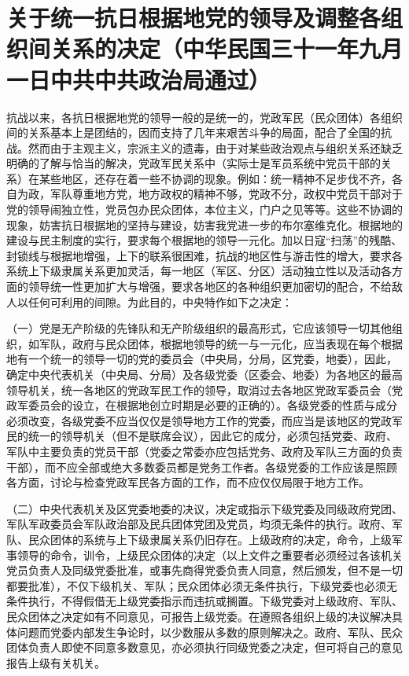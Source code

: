\section[关于统一抗日根据地党的领导及调整各组织间关系的决定（中华民国三十一年九月一日中共中共政治局通过）]{关于统一抗日根据地党的领导及调整各组织间关系的决定（中华民国三十一年九月一日中共中共政治局通过）}


抗战以来，各抗日根据地党的领导一般的是统一的，党政军民（民众团体）各组织间的关系基本上是团结的，因而支持了几年来艰苦斗争的局面，配合了全国的抗战。然而由于主观主义，宗派主义的遗毒，由于对某些政治观点与组织关系还缺乏明确的了解与恰当的解决，党政军民关系中（实际士是军员系统中党员干部的关系）在某些地区，还存在着一些不协调的现象。例如：统一精神不足步伐不齐，各自为政，军队尊重地方党，地方政权的精神不够，党政不分，政权中党员干部对于党的领导闹独立性，党员包办民众团体，本位主义，门户之见等等。这些不协调的现象，妨害抗日根据地的坚持与建设，妨害我党进一步的布尔塞维克化。根据地的建设与民主制度的实行，要求每个根据地的领导一元化。加以日寇“扫荡”的残酷、封锁线与根据地增强，上下的联系很困难，抗战的地区性与游击性的增大，要求各系统上下级隶属关系更加灵活，每一地区（军区、分区）活动独立性以及活动各方面的领导统一性更加扩大与增强，要求各地区的各种组织更加密切的配合，不给敌人以任何可利用的间隙。为此目的，中央特作如下之决定：

（一）党是无产阶级的先锋队和无产阶级组织的最高形式，它应该领导一切其他组织，如军队，政府与民众团体，根据地领导的统一与一元化，应当表现在每个根据地有一个统一的领导一切的党的委员会（中央局，分局，区党委，地委），因此，确定中央代表机关（中央局、分局）及各级党委（区委会、地委）为各地区的最高领导机关，统一各地区的党政军民工作的领导，取消过去各地区党政军委员会（党政军委员会的设立，在根据地创立时期是必要的正确的）。各级党委的性质与成分必须改变，各级党委不应当仅仅是领导地方工作的党委，而应当是该地区的党政军民的统一的领导机关（但不是联席会议），因此它的成分，必须包括党委、政府、军队中主要负责的党员干部（党委之常委亦应包括党务、政府及军队三方面的负责干部），而不应全部或绝大多数委员都是党务工作者。各级党委的工作应该是照顾各方面，讨论与检查党政军民各方面的工作，而不应仅仅局限于地方工作。

（二）中央代表机关及区党委地委的决议，决定或指示下级党委及同级政府党团、军队军政委员会军队政治部及民兵团体党团及党员，均须无条件的执行。政府、军队、民众团体的系统与上下级隶属关系仍旧存在。上级政府的决定，命令，上级军事领导的命令，训令，上级民众团体的决定（以上文件之重要者必须经过各该机关党员负责人及同级党委批准，或事先商得党委负责人同意，然后颁发，但不是一切都要批准），不仅下级机关、军队；民众团体必须无条件执行，下级党委也必须无条件执行，不得假借无上级党委指示而违抗或搁置。下级党委对上级政府、军队、民众团体之决定如有不同意见，可报告上级党委。在遵照各组织上级的决议解决具体问题而党委内部发生争论时，以少数服从多数的原则解决之。政府、军队、民众团体负责人即使不同意多数意见，亦必须执行同级党委之决定，但可将自己的意见报告上级有关机关。

